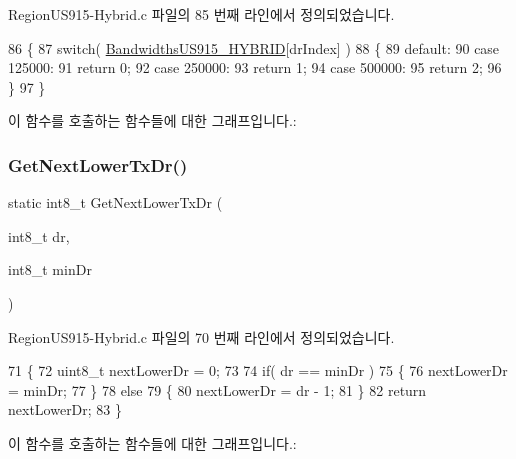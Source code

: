 Region\+U\+S915-\/\+Hybrid.\+c 파일의 85 번째 라인에서 정의되었습니다.


\begin{DoxyCode}
86 \{
87     \textcolor{keywordflow}{switch}( \mbox{\hyperlink{group___r_e_g_i_o_n_u_s915_h_y_b_gada3976d142cb9c990e9af2567ff8ecca}{BandwidthsUS915\_HYBRID}}[drIndex] )
88     \{
89         \textcolor{keywordflow}{default}:
90         \textcolor{keywordflow}{case} 125000:
91             \textcolor{keywordflow}{return} 0;
92         \textcolor{keywordflow}{case} 250000:
93             \textcolor{keywordflow}{return} 1;
94         \textcolor{keywordflow}{case} 500000:
95             \textcolor{keywordflow}{return} 2;
96     \}
97 \}
\end{DoxyCode}
이 함수를 호출하는 함수들에 대한 그래프입니다.\+:
\mbox{\label{_region_u_s915-_hybrid_8c_ae06574681e2f7c3f3e604878c81743aa}} 
\subsubsection{\texorpdfstring{Get\+Next\+Lower\+Tx\+Dr()}{GetNextLowerTxDr()}}
{\footnotesize\ttfamily static int8\+\_\+t Get\+Next\+Lower\+Tx\+Dr (\begin{DoxyParamCaption}\item[{int8\+\_\+t}]{dr,  }\item[{int8\+\_\+t}]{min\+Dr }\end{DoxyParamCaption})\hspace{0.3cm}{\ttfamily [static]}}



Region\+U\+S915-\/\+Hybrid.\+c 파일의 70 번째 라인에서 정의되었습니다.


\begin{DoxyCode}
71 \{
72     uint8\_t nextLowerDr = 0;
73 
74     \textcolor{keywordflow}{if}( dr == minDr )
75     \{
76         nextLowerDr = minDr;
77     \}
78     \textcolor{keywordflow}{else}
79     \{
80         nextLowerDr = dr - 1;
81     \}
82     \textcolor{keywordflow}{return} nextLowerDr;
83 \}
\end{DoxyCode}
이 함수를 호출하는 함수들에 대한 그래프입니다.\+:
\mbox{\label{_region_u_s915-_hybrid_8c_af2821991c6e6dad3e196b01f6cf1d542}} 
